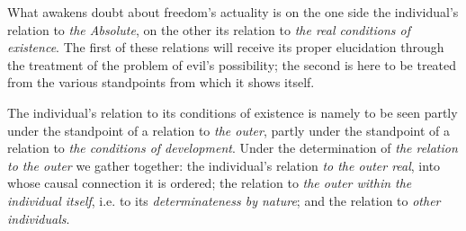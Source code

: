 \documentclass[12pt,a4paper]{book}
\begin{document}
What awakens doubt about freedom's actuality is on the one side the
individual's relation to \emph{the Absolute},
on the other its relation to \emph{the real conditions of existence}. The first
of these relations will receive its proper elucidation through the treatment of
the problem of evil's possibility; the second is here to be treated from the
various standpoints from which it shows itself.

The individual's relation to its conditions of existence is namely to be seen
partly under the standpoint of a relation to \emph{the outer}, partly under the
standpoint of a relation to \emph{the conditions of development}. Under the
determination of \emph{the relation to the outer} we gather together: the
individual's relation \emph{to the outer real}, into whose causal connection it
is ordered; the relation to \emph{the outer within the individual itself}, i.e.
to its \emph{determinateness by nature}; and the relation to \emph{other
individuals}.
\end{document}
